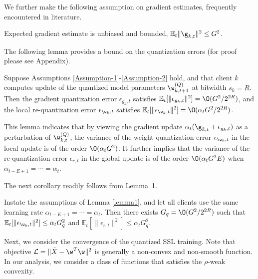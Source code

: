 We further make the following assumption on gradient estimates, frequently encountered in literature.
\begin{assumption}\label{Assumption-2}
Expected gradient estimate is unbiased and bounded, $\mathbb{E}_t \|\g_{k, t} \|^2 \leq G^2$.
\end{assumption}

The following lemma provides a bound on the quantization errors (for proof please see Appendix).
\begin{lemma}\label{lemma1}
Suppose Assumptions \ref{Assumption-1}-\ref{Assumption-2} hold, and that client $k$ computes update of the quantized model parameters $\w_{k, t+1}^{(Q)}$ at bitwidth
$s_k = R$. Then the gradient quantization error $\epsilon_{g_k, t}$ satisfies $\mathbb{E}_t[\|\epsilon_{g_k, t} \|^2] = \O(G^2/2^{2R})$, and the local re-quantization error $\epsilon_{\w_k, t}$ satisfies $\mathbb{E}_t[ \|\epsilon_{\w_k, t}\|^2] = \O(\alpha_t G^2/2^{2R})$.
\end{lemma}

This lemma indicates that by viewing the gradient update $\alpha_t (\g_{k, t} + \epsilon_{g_k, t} )$ as a perturbation of $\w^{(Q)}_{k, t}$, the variance of the weight quantization error $\epsilon_{\w_k, t}$ in the local update is of the order $\O(\alpha_tG^2)$. It further implies that the variance of the re-quantization error $\epsilon_{r, t}$ in the global update is of the order $\O(\alpha_t G^2 E)$ when $\alpha_{t-E+1} = \cdots = \alpha_t$. 

The next corollary readily follows from Lemma~1.

\begin{corollary}\label{corollary1}
Instate the assumptions of Lemma \ref{lemma1}, and let all clients use the same learning rate $\alpha_{t-E+1} = \cdots = \alpha_t$. Then there exists $G_q = \O(G^2/2^{2R})$ such that $\mathbb{E}_t[\|\epsilon_{\w_k, t} \|^2 ]\leq \alpha_t G_q^2 $ and $\mathbb{E}_t[\|\epsilon_{r, t} \|^2 ]\leq \alpha_t G_q^2 $.
\end{corollary}

Next, we consider the convergence of the quantized SSL training. Note that objective $\mathcal{L} = \|\bar{X} - \w^T \w \|^2$ is generally a non-convex and non-smooth function. In our analysis, we consider a class of functions that satisfies the $\rho$-weak convexity. 

